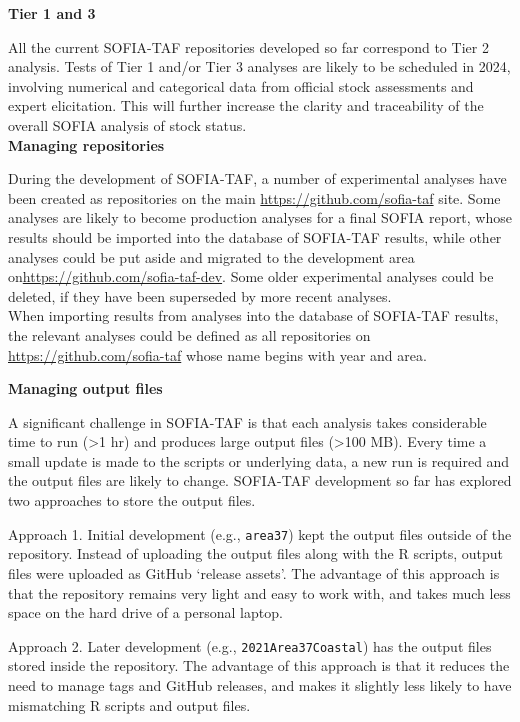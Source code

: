 \documentclass[12pt]{article}
\newcommand\blue[1]{\textcolor{darkblue}{#1}}
\newcommand\gt{\raisebox{0.1ex}\textgreater}
\begin{document}
\textbf{Tier 1 and 3}

All the current SOFIA-TAF repositories developed so far correspond to Tier 2
analysis. Tests of Tier 1 and/or Tier 3 analyses are likely to be scheduled in
2024, involving numerical and categorical data from official stock assessments
and expert elicitation. This will further increase the clarity and traceability
of the overall SOFIA analysis of stock status.\\[-2ex]

\textbf{Managing repositories}

During the development of SOFIA-TAF, a number of experimental analyses have been
created as repositories on the main \blue{\url{https://github.com/sofia-taf}}
site. Some analyses are likely to become production analyses for a final SOFIA
report, whose results should be imported into the database of SOFIA-TAF results,
while other analyses could be put aside and migrated to the development area
on\linebreak \mbox{\blue{\url{https://github.com/sofia-taf-dev}}}. Some older
experimental analyses could be deleted, if they have been superseded by more
recent analyses.\\[-2ex]

When importing results from analyses into the database of SOFIA-TAF results, the
relevant analyses could be defined as all repositories on
\blue{\url{https://github.com/sofia-taf}} whose name begins with year and area.

\newpage

\textbf{Managing output files}

A significant challenge in SOFIA-TAF is that each analysis takes considerable
time to run (\gt 1 hr) and produces large output files (\gt 100 MB). Every time
a small update is made to the scripts or underlying data, a new run is required
and the output files are likely to change. SOFIA-TAF development so far has
explored two approaches to store the output files.

Approach 1. Initial development (e.g., \verb|area37|) kept the output files
outside of the repository. Instead of uploading the output files along with the
R scripts, output files were uploaded as GitHub `release assets'. The advantage
of this approach is that the repository remains very light and easy to work
with, and takes much less space on the hard drive of a personal laptop.

Approach 2. Later development (e.g., \verb|2021Area37Coastal|) has the output
files stored inside the repository. The advantage of this approach is that it
reduces the need to manage tags and GitHub releases, and makes it slightly less
likely to have mismatching R scripts and output files.
\end{document}
